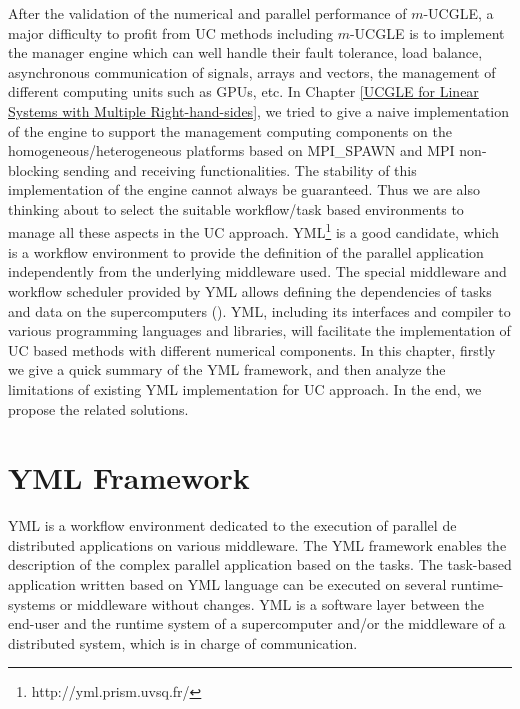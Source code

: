 \begin{displayquote}
	\textsf{After the validation of the numerical and parallel performance of $m$-UCGLE, a major difficulty to profit from UC methods including $m$-UCGLE is to implement the manager engine which can well handle their fault tolerance, load balance, asynchronous communication of signals, arrays and vectors, the management of different computing units such as GPUs, etc. In Chapter \ref{UCGLE for Linear Systems with Multiple Right-hand-sides}, we tried to give a naive implementation of the engine to support the management computing components on the homogeneous/heterogeneous platforms based on MPI\_SPAWN and MPI non-blocking sending and receiving functionalities. The stability of this implementation of the engine cannot always be guaranteed. Thus we are also thinking about to select the suitable workflow/task based environments to manage all these aspects in the UC approach. YML\footnote{http://yml.prism.uvsq.fr/} is a good candidate, which is a workflow environment to provide the definition of the parallel application independently from the underlying middleware used. The special middleware and workflow scheduler provided by YML allows defining the dependencies of tasks and data on the supercomputers (\cite{delannoyyml}). YML, including its interfaces and compiler to various programming languages and libraries, will facilitate the implementation of UC based methods with different numerical components. In this chapter, firstly we give a quick summary of the YML framework, and then analyze the limitations of existing YML implementation for UC approach. In the end, we propose the related solutions.}
\end{displayquote}

\vspace{0.6in}


\section{YML Framework}

YML is a workflow environment dedicated to the execution of parallel de distributed applications on various middleware. The YML framework enables the description of the complex parallel application based on the tasks. The task-based application written based on YML language can be executed on several runtime-systems or middleware without changes. YML is a software layer between the end-user and the runtime system of a supercomputer and/or the middleware of a distributed system, which is in charge of communication. 

